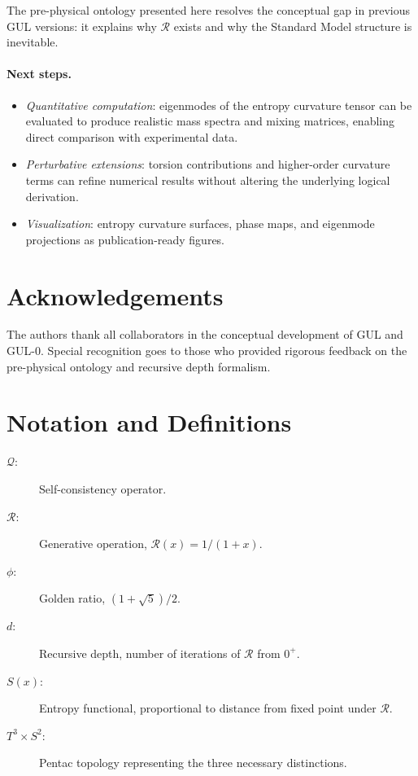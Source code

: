 \documentclass[11pt]{article}
\begin{document}
The pre-physical ontology presented here resolves the conceptual
gap in previous GUL versions: it explains why $\mathcal{R}$ exists
and why the Standard Model structure is inevitable.

\paragraph{Next steps.}
\begin{itemize}
  \item \emph{Quantitative computation}: eigenmodes of the entropy
        curvature tensor can be evaluated to produce realistic mass
        spectra and mixing matrices, enabling direct comparison
        with experimental data.
  \item \emph{Perturbative extensions}: torsion contributions and
        higher-order curvature terms can refine numerical results
        without altering the underlying logical derivation.
  \item \emph{Visualization}: entropy curvature surfaces, phase
        maps, and eigenmode projections as publication-ready figures.
\end{itemize}

\section*{Acknowledgements}

The authors thank all collaborators in the conceptual development
of GUL and GUL-0. Special recognition goes to those who provided
rigorous feedback on the pre-physical ontology and recursive depth
formalism.

\appendix

\section{Notation and Definitions}
\label{app:notation}

\begin{description}
  \item[$\mathcal{Q}$:] Self-consistency operator.
  \item[$\mathcal{R}$:] Generative operation,
        $\mathcal{R}(x)=1/(1+x)$.
  \item[$\phi$:] Golden ratio, $(1+\sqrt{5})/2$.
  \item[$d$:] Recursive depth, number of iterations of
        $\mathcal{R}$ from $0^+$.
  \item[$S(x)$:] Entropy functional, proportional to distance
        from fixed point under $\mathcal{R}$.
  \item[$T^3\times S^2$:] Pentac topology representing the three
        necessary distinctions.
\end{description}
\end{document}
